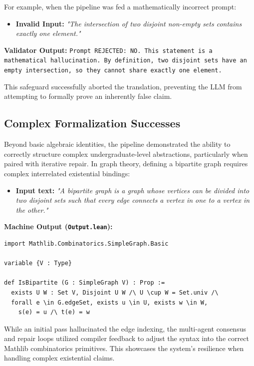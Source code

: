 For example, when the pipeline was fed a mathematically incorrect prompt:
\begin{itemize}
    \item \textbf{Invalid Input:} \textit{"The intersection of two disjoint non-empty sets contains exactly one element."}
\end{itemize}
\textbf{Validator Output:} \texttt{Prompt REJECTED: NO. This statement is a mathematical hallucination. By definition, two disjoint sets have an empty intersection, so they cannot share exactly one element.}

This safeguard successfully aborted the translation, preventing the LLM from attempting to formally prove an inherently false claim.

\subsection{Complex Formalization Successes}
Beyond basic algebraic identities, the pipeline demonstrated the ability to correctly structure complex undergraduate-level abstractions, particularly when paired with iterative repair. In graph theory, defining a bipartite graph requires complex interrelated existential bindings:

\begin{itemize}
    \item \textbf{Input text:} \textit{"A bipartite graph is a graph whose vertices can be divided into two disjoint sets such that every edge connects a vertex in one to a vertex in the other." }
\end{itemize}

\textbf{Machine Output (\texttt{Output.lean}):}
\begin{verbatim}
import Mathlib.Combinatorics.SimpleGraph.Basic

variable {V : Type}

def IsBipartite (G : SimpleGraph V) : Prop :=
  exists U W : Set V, Disjoint U W /\ U \cup W = Set.univ /\
  forall e \in G.edgeSet, exists u \in U, exists w \in W,
    s(e) = u /\ t(e) = w
\end{verbatim}

While an initial pass hallucinated the edge indexing, the multi-agent consensus and repair loops utilized compiler feedback to adjust the syntax into the correct Mathlib combinatorics primitives. This showcases the system's resilience when handling complex existential claims.

